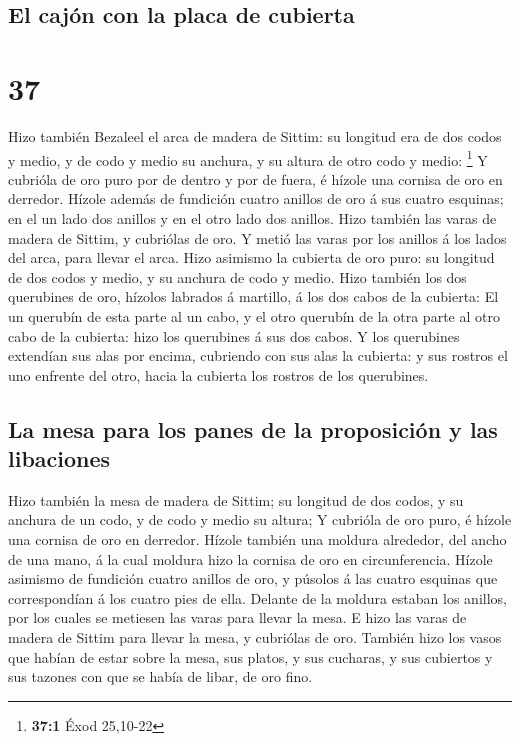 \hypertarget{el-cajuxf3n-con-la-placa-de-cubierta}{%
\subsection{El cajón con la placa de
cubierta}\label{el-cajuxf3n-con-la-placa-de-cubierta}}

\hypertarget{section-36}{%
\section{37}\label{section-36}}

 Hizo también Bezaleel el arca de madera de Sittim: su
longitud era de dos codos y medio, y de codo y medio su anchura, y su
altura de otro codo y medio: \footnote{\textbf{37:1} Éxod 25,10-22}
 Y cubrióla de oro puro por de dentro y por de fuera, é
hízole una cornisa de oro en derredor.  Hízole además de
fundición cuatro anillos de oro á sus cuatro esquinas; en el un lado dos
anillos y en el otro lado dos anillos.  Hizo también las
varas de madera de Sittim, y cubriólas de oro.  Y metió las
varas por los anillos á los lados del arca, para llevar el arca.
 Hizo asimismo la cubierta de oro puro: su longitud de dos
codos y medio, y su anchura de codo y medio.  Hizo también
los dos querubines de oro, hízolos labrados á martillo, á los dos cabos
de la cubierta:  El un querubín de esta parte al un cabo, y
el otro querubín de la otra parte al otro cabo de la cubierta: hizo los
querubines á sus dos cabos.  Y los querubines extendían sus
alas por encima, cubriendo con sus alas la cubierta: y sus rostros el
uno enfrente del otro, hacia la cubierta los rostros de los querubines.

\hypertarget{la-mesa-para-los-panes-de-la-proposiciuxf3n-y-las-libaciones}{%
\subsection{La mesa para los panes de la proposición y las
libaciones}\label{la-mesa-para-los-panes-de-la-proposiciuxf3n-y-las-libaciones}}

 Hizo también la mesa de madera de Sittim; su longitud de
dos codos, y su anchura de un codo, y de codo y medio su altura;
 Y cubrióla de oro puro, é hízole una cornisa de oro en
derredor.  Hízole también una moldura alrededor, del ancho
de una mano, á la cual moldura hizo la cornisa de oro en circunferencia.
 Hízole asimismo de fundición cuatro anillos de oro, y
púsolos á las cuatro esquinas que correspondían á los cuatro pies de
ella.  Delante de la moldura estaban los anillos, por los
cuales se metiesen las varas para llevar la mesa.  E hizo
las varas de madera de Sittim para llevar la mesa, y cubriólas de oro.
 También hizo los vasos que habían de estar sobre la mesa,
sus platos, y sus cucharas, y sus cubiertos y sus tazones con que se
había de libar, de oro fino.

